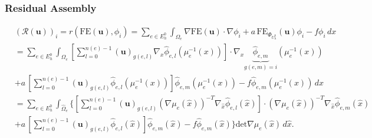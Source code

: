 \begin{frame}
\frametitle{Residual Assembly}
\begin{equation*}
\begin{split}
&(\mathcal{R}(\mathbf{u}) )_i  = r\left(\text{FE}(\mathbf{u}),\phi_i\right)
= \sum_{e\in E_h^0} \int_{\Omega_e} \nabla \text{FE}(\mathbf{u}) \cdot \nabla\phi_i 
+ a \, \text{FE}_{\Phi_{U_h^k}}(\mathbf{u}) \phi_i - f \phi_i \,dx\\
&= \sum_{e\in E_h^0} \int_{\Omega_e} 
\left[ \sum_{l=0}^{n(e)-1} (\mathbf{u})_{g(e,l)} \nabla_x \hat\phi_{e,l}(\mu_e^{-1}(x))\right]
\cdot \nabla_x \underbrace{\hat\phi_{e,m}}_{g(e,m)=i}(\mu_e^{-1}(x))\\
& + a \, \left[ \sum_{l=0}^{n(e)-1} (\mathbf{u})_{g(e,l)} \hat\phi_{e,l}(\mu_e^{-1}(x)) \right] \hat\phi_{e,m}(\mu_e^{-1}(x))
- f \hat\phi_{e,m}(\mu_e^{-1}(x)) \, dx\\
&= \sum_{e\in E_h^0} \int_{\hat\Omega_e} 
\Biggl\{\left[ \sum_{l=0}^{n(e)-1} (\mathbf{u})_{g(e,l)} (\nabla \mu_e(\hat{x}))^{-T}\nabla_{\hat{x}} \hat\phi_{e,l}(\hat{x})\right]
\cdot (\nabla \mu_e(\hat{x}))^{-T} \nabla_{\hat{x}} \hat\phi_{e,m}(\hat{x})\\
& + a \, \left[ \sum_{l=0}^{n(e)-1} (\mathbf{u})_{g(e,l)} \hat\phi_{e,l}(\hat{x}) \right] \hat\phi_{e,m}(\hat{x})
- f \hat\phi_{e,m}(\hat{x}) \Biggr\} \text{det} \nabla\mu_e(\hat{x}) \, d\hat{x} .
\end{split}
\end{equation*}
\end{frame}

